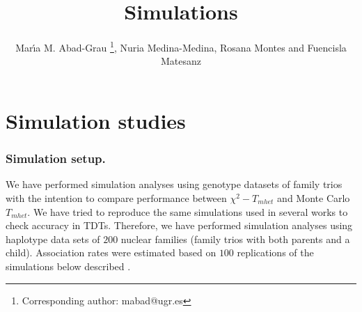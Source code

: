 \documentclass[runningheads]{/home/mabad/conferences/LNCS/llncs}
\begin{document}
\mainmatter 


\title{Simulations}





\author{Mar\'{\i}a M. Abad-Grau
\thanks{Corresponding author: mabad@ugr.es}, Nuria Medina-Medina, Rosana Montes and Fuencisla Matesanz }
%





\date{}

\maketitle




\section{Simulation studies}\label{sec:simulations}

\subsubsection{Simulation setup.}

We have performed simulation analyses using genotype datasets of family trios with the intention to compare performance between $\chi^2-T_{mhet}$ and Monte Carlo $T_{mhet}$.
We have tried to reproduce the same simulations used in several works to check accuracy in TDTs\cite{Sham.97,Zhang.zz.2003,Yu.zz.2005}. Therefore, we have performed simulation analyses using haplotype data sets of $200$ nuclear families (family trios with both parents and a child).
Association rates were estimated based on $100$ replications 
of the simulations below described \cite{Sham.97,Zhang.zz.2003,Yu.zz.2005}.
\end{document}
